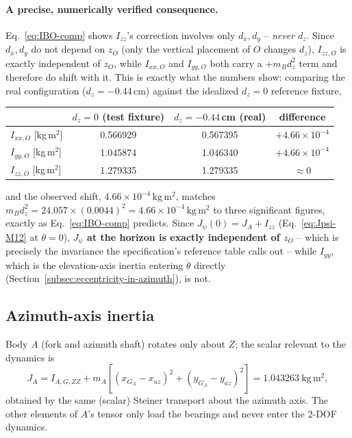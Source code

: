 \documentclass[11pt,a4paper]{article}
\numberwithin{equation}{section}
\begin{document}
\paragraph{A precise, numerically verified consequence.} Eq.~\eqref{eq:IBO-comp} shows $I_{zz}$'s correction involves only $d_x,d_y$ -- \emph{never} $d_z$. Since $d_x,d_y$ do not depend on $z_O$ (only the vertical placement of $O$ changes $d_z$), $I_{zz,O}$ is exactly independent of $z_O$, while $I_{xx,O}$ and $I_{yy,O}$ both carry a $+m_Bd_z^2$ term and therefore do shift with it. This is exactly what the numbers show: comparing the real configuration ($d_z=-0.44$\,cm) against the idealized $d_z=0$ reference fixture,
\begin{center}
\begin{tabular}{@{}lccc@{}}
\toprule
 & $d_z=0$ (test fixture) & $d_z=-0.44$\,cm (real) & difference \\
\midrule
$I_{xx,O}$ [kg\,m$^2$] & 0.566929 & 0.567395 & $+4.66\times10^{-4}$ \\
$I_{yy,O}$ [kg\,m$^2$] & 1.045874 & 1.046340 & $+4.66\times10^{-4}$ \\
$I_{zz,O}$ [kg\,m$^2$] & 1.279335 & 1.279335 & $\approx 0$ \\
\bottomrule
\end{tabular}
\end{center}
and the observed shift, $4.66\times10^{-4}\,\mathrm{kg\,m^2}$, matches $m_B d_z^2 = 24.057\times(0.0044)^2 = 4.66\times10^{-4}\,\mathrm{kg\,m^2}$ to three significant figures, exactly as Eq.~\eqref{eq:IBO-comp} predicts. Since $J_\psi(0) = J_A + I_{zz}$ (Eq.~\eqref{eq:Jpsi-M12} at $\theta=0$), \textbf{$J_\psi$ at the horizon is exactly independent of $z_O$} -- which is precisely the invariance the specification's reference table calls out -- while $I_{yy}$, which is the elevation-axis inertia entering $\ddot\theta$ directly (Section~\ref{subsec:eccentricity-in-azimuth}), is not.

\subsection{Azimuth-axis inertia}

Body $A$ (fork and azimuth shaft) rotates only about $Z$; the scalar relevant to the dynamics is
\begin{equation}
J_A = I_{A,G,ZZ} + m_A\left[(x_{G_A}-x_{az})^2+(y_{G_A}-y_{az})^2\right] = 1.043263\ \mathrm{kg\,m^2},
\end{equation}
obtained by the same (scalar) Steiner transport about the azimuth axis. The other elements of $A$'s tensor only load the bearings and never enter the 2-DOF dynamics.
\end{document}
